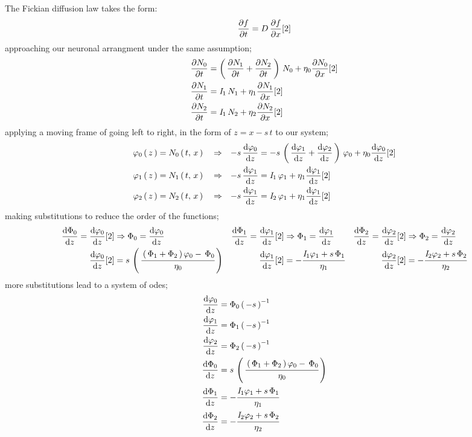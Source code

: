 \documentclass[class={myRUCProject}, crop=false]{standalone}
\begin{document}
The Fickian diffusion law takes the form:
\begin{equation}
    \pde{t}{f} = D\,\pde{x}{f}[2]
\end{equation}
approaching our neuronal arrangment under the same assumption;
\begin{align}
    \pde{t}{N_0} &= \br{\pde{t}{N_1}+\pde{t}{N_2}}\,N_0 + \eta_0\pde{x}{N_0}[2] \\
    \pde{t}{N_1} &= \curr_1\,N_1 + \eta_1\pde{x}{N_1}[2] \\
    \pde{t}{N_2} &= \curr_1\,N_2 + \eta_2\pde{x}{N_2}[2] 
\end{align}
applying a moving frame of going left to right, in the form of \(z=x-s\,t\) to our system;
\begin{align}
    \varphi_0\br{z} &= N_0\br{t,\,x} &&\implies& -s\,\ode[z]{\varphi_0} &= -s\,\br{\ode[z]{\varphi_1}+\ode[z]{\varphi_2}}\,\varphi_0 + \eta_0\ode[z]{\varphi_0}[2] \\
    \varphi_1\br{z} &= N_1\br{t,\,x} &&\implies& -s\,\ode[z]{\varphi_1} &= \curr_1\,\varphi_1 + \eta_1\ode[z]{\varphi_1}[2] \\
    \varphi_2\br{z} &= N_2\br{t,\,x} &&\implies& -s\,\ode[z]{\varphi_1} &= \curr_2\,\varphi_1 + \eta_1\ode[z]{\varphi_1}[2] 
\end{align}
making substitutions to reduce the order of the functions;
\begin{align*}
    \ode[z]{\Phi_0} = \ode[z]{\varphi_0}[2] &\implies \Phi_0 = \ode[z]{\varphi_0} &
    \ode[z]{\Phi_1} = \ode[z]{\varphi_1}[2] &\implies \Phi_1 = \ode[z]{\varphi_1} &
    \ode[z]{\Phi_2} = \ode[z]{\varphi_2}[2] &\implies \Phi_2 = \ode[z]{\varphi_2}\\
    \ode[z]{\varphi_0}[2] &= s\,\br{\cfrac{\br{\Phi_1+\Phi_2}\varphi_0 - \,\Phi_0}{\eta_0}} &
    \ode[z]{\varphi_1}[2] &= -\cfrac{\curr_1 \varphi_1 + s \,\Phi_1}{\eta_1} &
    \ode[z]{\varphi_2}[2] &= -\cfrac{\curr_2 \varphi_2 + s \,\Phi_2}{\eta_2} 
\end{align*}
more substitutions lead to a system of \glspl{ode};
\begin{align}
    \ode[z]{\varphi_0} &= {\Phi_0}\br{-s}^{-1} \\
    \ode[z]{\varphi_1} &= {\Phi_1}\br{-s}^{-1} \\
    \ode[z]{\varphi_2} &= {\Phi_2}\br{-s}^{-1} \\
    \ode[z]{\Phi_0} &= s\,\br{\cfrac{\br{\Phi_1+\Phi_2}\varphi_0 - \,\Phi_0}{\eta_0}} \\
    \ode[z]{\Phi_1} &= -\cfrac{\curr_1 \varphi_1 + s \,\Phi_1}{\eta_1}\\
    \ode[z]{\Phi_2} &= -\cfrac{\curr_2 \varphi_2 + s \,\Phi_2}{\eta_2}
\end{align}
\end{document}
